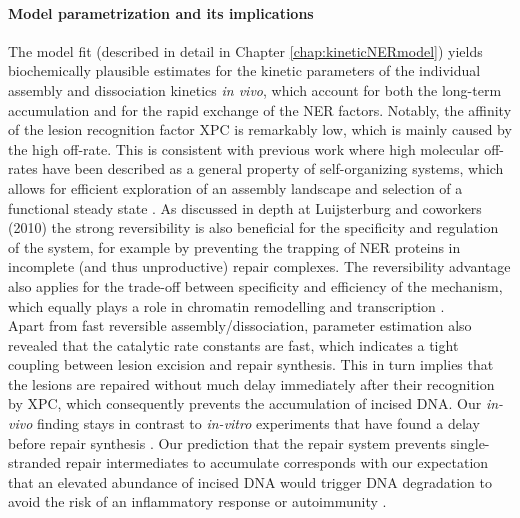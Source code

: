 \paragraph{Model parametrization and its implications}
The model fit (described in detail in Chapter \ref{chap:kineticNERmodel}) yields biochemically plausible estimates for the kinetic parameters of the individual assembly and dissociation kinetics \textit{in vivo}, which account for both the long-term accumulation and for the rapid exchange of the NER factors. Notably, the affinity of the lesion recognition factor XPC is remarkably low, which is mainly caused by the high off-rate. This is consistent with previous work where high molecular off-rates have been described as a general property of self-organizing systems, which allows for efficient exploration of an assembly landscape and selection of a functional steady state \cite{Kirschner2000}. As discussed in depth at Luijsterburg and coworkers (2010)\cite{Luijsterburg2010} the strong reversibility is also beneficial for the specificity and regulation of the system, for example by preventing the trapping of NER proteins in incomplete (and thus unproductive) repair complexes. The reversibility advantage also applies for the trade-off between specificity and efficiency of the mechanism, which equally plays a role in chromatin remodelling and transcription \cite{Cook2010,Voss2011}.\\
Apart from fast reversible assembly/dissociation, parameter estimation also revealed that the catalytic rate constants are fast, which indicates a tight coupling between lesion excision and repair synthesis. This in turn implies that the lesions are repaired without much delay immediately after their recognition by XPC, which consequently prevents the accumulation of incised DNA. Our \textit{in-vivo} finding stays in contrast to \textit{in-vitro} experiments that have found a delay before repair synthesis \cite{Mocquet2008,Riedl2003}. Our prediction that the repair system prevents single-stranded repair intermediates to accumulate corresponds with our expectation that an elevated abundance of incised DNA would trigger DNA degradation to avoid the risk of an inflammatory response or autoimmunity \cite{Takeuchi2010}.             



